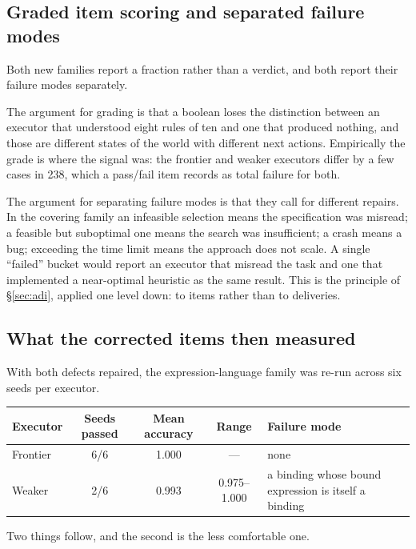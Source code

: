 \documentclass[11pt]{article}
\theoremstyle{definition}
\begin{document}
\subsection{Graded item scoring and separated failure modes}\label{sec:graded}

Both new families report a fraction rather than a verdict, and both report their failure modes separately.

The argument for grading is that a boolean loses the distinction between an executor that understood eight rules of ten and one that produced nothing, and those are different states of the world with different next actions. Empirically the grade is where the signal was: the frontier and weaker executors differ by a few cases in 238, which a pass/fail item records as total failure for both.

The argument for separating failure modes is that they call for different repairs. In the covering family an infeasible selection means the specification was misread; a feasible but suboptimal one means the search was insufficient; a crash means a bug; exceeding the time limit means the approach does not scale. A single ``failed'' bucket would report an executor that misread the task and one that implemented a near-optimal heuristic as the same result. This is the principle of \S\ref{sec:adi}, applied one level down: to items rather than to deliveries.

\subsection{What the corrected items then measured}\label{sec:corrected}

With both defects repaired, the expression-language family was re-run across six seeds per executor.

\begin{table}[h]
\centering\small
\begin{tabularx}{\textwidth}{@{}lcccY@{}}
\toprule
Executor & Seeds passed & Mean accuracy & Range & Failure mode \\
\midrule
Frontier & 6/6 & 1.000 & --- & none \\
Weaker & 2/6 & 0.993 & 0.975--1.000 & a binding whose bound expression is itself a binding \\
\bottomrule
\end{tabularx}
\end{table}

Two things follow, and the second is the less comfortable one.
\end{document}
